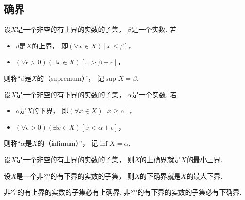 \subsection{确界}
\begin{definition}
设\(X\)是一个非空的有上界的实数的子集，
\(\beta\)是一个实数.
若\begin{itemize}
	\item \(\beta\)是\(X\)的上界，
	即\((\forall x \in X)[x \leq \beta]\)，

	\item \((\forall \epsilon>0)(\exists x \in X)[x>\beta-\epsilon]\)，
\end{itemize}
则称“\(\beta\)是\(X\)的（supremum）”，
记\(\sup X = \beta\).
\end{definition}

\begin{definition}
设\(X\)是一个非空的有下界的实数的子集，
\(\alpha\)是一个实数.
若\begin{itemize}
	\item \(\alpha\)是\(X\)的下界，
	即\((\forall x \in X)[x \geq \alpha]\)，

	\item \((\forall \epsilon>0)(\exists x \in X)[x<\alpha+\epsilon]\)，
\end{itemize}
则称“\(\alpha\)是\(X\)的（infimum）”，
记\(\inf X = \alpha\).
\end{definition}

\begin{proposition}
设\(X\)是一个非空的有上界的实数的子集，
则\(X\)的上确界就是\(X\)的最小上界.
\end{proposition}

\begin{proposition}
设\(X\)是一个非空的有下界的实数的子集，
则\(X\)的下确界就是\(X\)的最大下界.
\end{proposition}


\begin{theorem}[确界原理]\label{theorem:实数.确界原理}
非空的有上界的实数的子集必有上确界.
非空的有下界的实数的子集必有下确界.
\end{theorem}

